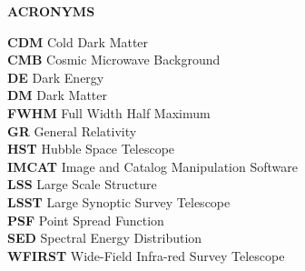 %
%
%
\thispagestyle{empty}
\begin{center}
\textbf{ACRONYMS}
\end{center}
\textbf{CDM}    \hspace{9.5mm} Cold Dark Matter \\
\textbf{CMB}    \hspace{10mm} Cosmic Microwave Background \\
\textbf{DE}     \hspace{15mm} Dark Energy \\
\textbf{DM}     \hspace{14mm} Dark Matter \\
\textbf{FWHM}   \hspace{6mm} Full Width Half Maximum \\
\textbf{GR}     \hspace{15mm} General Relativity \\
\textbf{HST}    \hspace{13mm} Hubble Space Telescope \\
\textbf{IMCAT}  \hspace{7mm} Image and Catalog Manipulation Software \\
\textbf{LSS}    \hspace{15mm} Large Scale Structure \\
\textbf{LSST}   \hspace{12mm} Large Synoptic Survey Telescope \\
\textbf{PSF}    \hspace{14mm} Point Spread Function \\
\textbf{SED}    \hspace{14mm} Spectral Energy Distribution \\
\textbf{WFIRST} \hspace{4mm}  Wide-Field Infra-red Survey Telescope \\
\clearpage
%
%